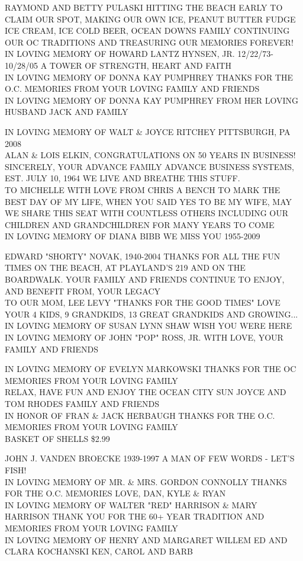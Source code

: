\documentclass[10pt,letterpaper]{article}
\begin{document}
RAYMOND AND BETTY PULASKI HITTING THE BEACH EARLY TO CLAIM OUR SPOT, MAKING OUR OWN ICE, PEANUT BUTTER FUDGE ICE CREAM, ICE COLD BEER, OCEAN  DOWNS FAMILY CONTINUING OUR OC TRADITIONS AND TREASURING OUR MEMORIES FOREVER!\\
IN LOVING MEMORY OF HOWARD LANTZ HYNSEN, JR.  12/22/73{-}10/28/05 A TOWER OF STRENGTH, HEART AND FAITH\\
IN LOVING MEMORY OF DONNA KAY PUMPHREY THANKS FOR THE O.C. MEMORIES FROM YOUR LOVING FAMILY AND FRIENDS\\
IN LOVING MEMORY OF DONNA KAY PUMPHREY FROM HER LOVING HUSBAND JACK AND FAMILY

IN LOVING MEMORY OF WALT \& JOYCE RITCHEY PITTSBURGH, PA 2008\\
ALAN \& LOIS ELKIN, CONGRATULATIONS ON 50 YEARS IN BUSINESS!  SINCERELY, YOUR ADVANCE FAMILY ADVANCE BUSINESS SYSTEMS, EST. JULY 10, 1964 WE LIVE AND BREATHE THIS STUFF.\\
TO MICHELLE WITH LOVE FROM CHRIS A BENCH TO MARK THE BEST DAY OF MY LIFE, WHEN YOU SAID YES TO BE MY WIFE, MAY WE SHARE THIS SEAT WITH COUNTLESS OTHERS INCLUDING OUR CHILDREN AND GRANDCHILDREN FOR MANY YEARS TO COME\\
IN LOVING MEMORY OF DIANA BIBB WE MISS YOU 1955{-}2009

EDWARD "SHORTY" NOVAK, 1940{-}2004 THANKS FOR ALL THE FUN TIMES ON THE BEACH, AT PLAYLAND'S 219 AND ON THE BOARDWALK.  YOUR FAMILY AND FRIENDS CONTINUE TO ENJOY, AND BENEFIT FROM, YOUR LEGACY\\
TO OUR MOM, LEE LEVY "THANKS FOR THE GOOD TIMES" LOVE YOUR 4 KIDS, 9 GRANDKIDS, 13 GREAT GRANDKIDS AND GROWING...\\
IN LOVING MEMORY OF SUSAN LYNN SHAW WISH YOU WERE HERE\\
IN LOVING MEMORY OF JOHN "POP" ROSS, JR. WITH LOVE, YOUR FAMILY AND FRIENDS

IN LOVING MEMORY OF EVELYN MARKOWSKI THANKS FOR THE OC MEMORIES FROM YOUR LOVING FAMILY\\
RELAX, HAVE FUN AND ENJOY THE OCEAN CITY SUN JOYCE AND TOM RHODES FAMILY AND FRIENDS\\
IN HONOR OF FRAN \& JACK HERBAUGH THANKS FOR THE O.C. MEMORIES FROM YOUR LOVING FAMILY\\
BASKET OF SHELLS \$2.99

JOHN J. VANDEN BROECKE 1939{-}1997 A MAN OF FEW WORDS {-} LET'S FISH!\\
IN LOVING MEMORY OF MR. \& MRS. GORDON CONNOLLY THANKS FOR THE O.C. MEMORIES LOVE, DAN, KYLE \& RYAN\\
IN LOVING MEMORY OF WALTER "RED" HARRISON \& MARY HARRISON THANK YOU FOR THE 60+ YEAR TRADITION AND MEMORIES FROM YOUR LOVING FAMILY\\
IN LOVING MEMORY OF HENRY AND MARGARET WILLEM ED AND CLARA KOCHANSKI KEN, CAROL AND BARB
\end{document}
